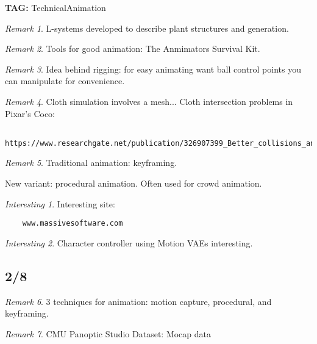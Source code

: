 \documentclass[11pt]{article}
\theoremstyle{remark}
\newtheorem{remark}{Remark}
\newtheorem{interest}{Interesting}
\begin{document}
\textbf{TAG:} TechnicalAnimation

\begin{remark}
	L-systems developed to describe plant structures and generation.
\end{remark}

\begin{remark}
	Tools for good animation: The Anmimators Survival Kit.
\end{remark}

\begin{remark}
	Idea behind rigging: for easy animating want ball control points you can manipulate for convenience.
\end{remark}

\begin{remark}
	Cloth simulation involves a mesh...
	Cloth intersection problems in Pixar's Coco:
	\begin{verbatim}
		https://www.researchgate.net/publication/326907399_Better_collisions_and_faster_cloth_for_Pixar's_Coco
	\end{verbatim}
\end{remark}

\begin{remark}
	Traditional animation: keyframing. 

	New variant: procedural animation. Often used for crowd animation.
\end{remark}

\begin{interest}
	Interesting site:
	\begin{verbatim}
	www.massivesoftware.com
	\end{verbatim}
\end{interest}

\begin{interest}
	Character controller using Motion VAEs interesting.
\end{interest}

\subsection{2/8}

\begin{remark}
	3 techniques for animation: motion capture, procedural, and keyframing.
\end{remark}

\begin{remark}
	CMU Panoptic Studio Dataset: Mocap data
\end{remark}
\end{document}
